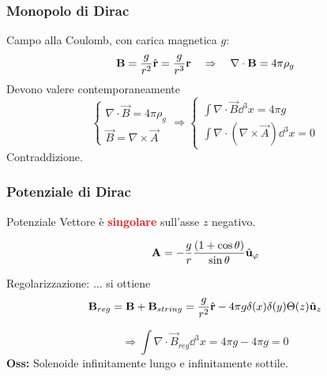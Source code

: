 


\frame{\titlepage}


\begin{frame}
\frametitle{Monopolo di Dirac}
Campo alla Coulomb, con carica magnetica $g$:
$$
   \mathbf{B} = \frac{g}{r^2} \hat{\mathbf{r}} = \frac{g}{r^3} \mathbf{r} \quad
   \Rightarrow \quad \nabla \cdot \mathbf{B} = 4\pi \rho_g
$$
Devono valere contemporaneamente
\begin{equation*}
\begin{cases}
   \nabla \cdot \vec B = 4\pi \rho_g\\
   \vec B = \nabla \times \vec A
\end{cases}
\Rightarrow
\begin{cases}
   \int \nabla \cdot \vec B \dd ^3 x = 4\pi g \\
   \int \nabla \cdot (\nabla \times \vec A) \dd ^3 x= 0
\end{cases}
\end{equation*}
Contraddizione.\\

\end{frame}


\begin{frame}
\frametitle{Potenziale di Dirac}
Potenziale Vettore
è \textcolor{red}{\textbf{singolare}} sull'asse $z$ negativo. \bigskip

$$
   \mathbf{A} = -\frac{g}{r}\frac{(1 + \cos\theta)}{\sin\theta} \hat{\mathbf{u}} _\varphi
$$

Regolarizzazione: ... si ottiene
$$\mathbf{B} _{reg} = \mathbf{B} + \mathbf{B} _{string} = \frac{g}{r^2} \hat{\mathbf{r}}
   - 4\pi g \delta(x)\delta(y)\Theta(z) \hat{\mathbf{u}} _z $$

   $$ \Rightarrow \int \nabla \cdot \vec B_{reg} \dd ^3 x = 4\pi g - 4\pi g = 0$$
\textbf{Oss:} Solenoide infinitamente lungo e infinitamente sottile.
\end{frame}


